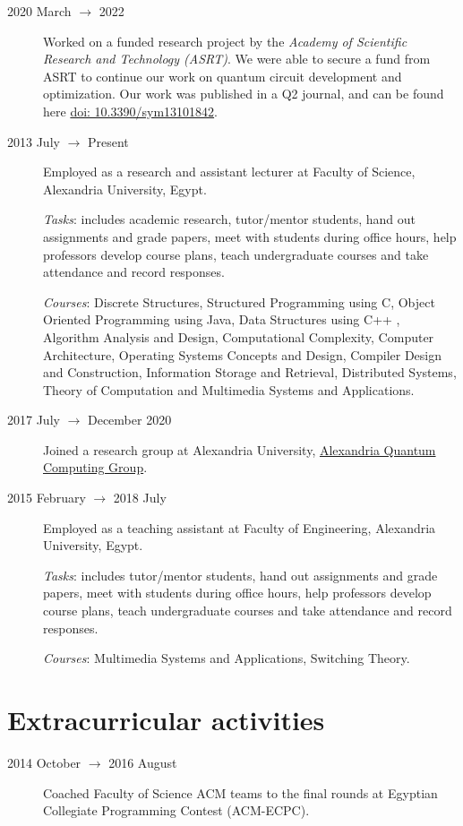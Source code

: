 \documentclass[margin,line,a4paper]{resume}
\newcommand*{\doi}[1]{\href{http://dx.doi.org/#1}{doi: #1}}
\begin{document}
\begin{resume}
\begin{description}
    \item[2020 March $\rightarrow$ 2022] Worked on a funded research project by the \textit{Academy of Scientific Research and Technology (ASRT)}. We were able to secure a fund from ASRT to continue our work on quantum circuit development and optimization. Our work was published in a Q2 journal, and can be found here \doi{10.3390/sym13101842}.

    
    \item[2013 July $\rightarrow$ Present] Employed as a research and assistant lecturer at Faculty of Science, Alexandria University, Egypt. 
    
    \emph{Tasks}: includes academic research, tutor/mentor students, hand out assignments and grade papers, meet with students during office hours, help professors develop course plans, teach undergraduate courses and take attendance and record responses.
       
    \emph{Courses}: Discrete Structures, Structured Programming using C, Object Oriented Programming using Java, Data Structures using C++ , Algorithm Analysis and Design, Computational Complexity, Computer Architecture, Operating Systems Concepts and Design, Compiler Design and Construction, Information Storage and Retrieval, Distributed Systems, Theory of Computation and Multimedia Systems and Applications.
    
        
	\item[2017 July $\rightarrow$ December 2020 ]  Joined a research group at Alexandria University, \href{http://www.sci.p.alexu.edu.eg/~aleqcg/index.html}{Alexandria Quantum Computing Group}.
    

        

	\item[2015 February $\rightarrow$ 2018 July] Employed as a teaching assistant at Faculty of Engineering, Alexandria University, Egypt. 
	
	\emph{Tasks}: includes tutor/mentor students, hand out assignments and grade papers, meet with students during office hours, help professors develop course plans, teach undergraduate courses and take attendance and record responses.        
    
	\emph{Courses}: Multimedia Systems and Applications, Switching Theory.
    
\end{description}



\section{\mysidestyle Extracurricular activities}\vspace{1mm}
    \begin{description}
    \item[2014 October $\rightarrow$ 2016 August] Coached Faculty of Science ACM teams to the final rounds at Egyptian Collegiate Programming Contest (ACM-ECPC).


\end{description}
\end{resume}
\end{document}
